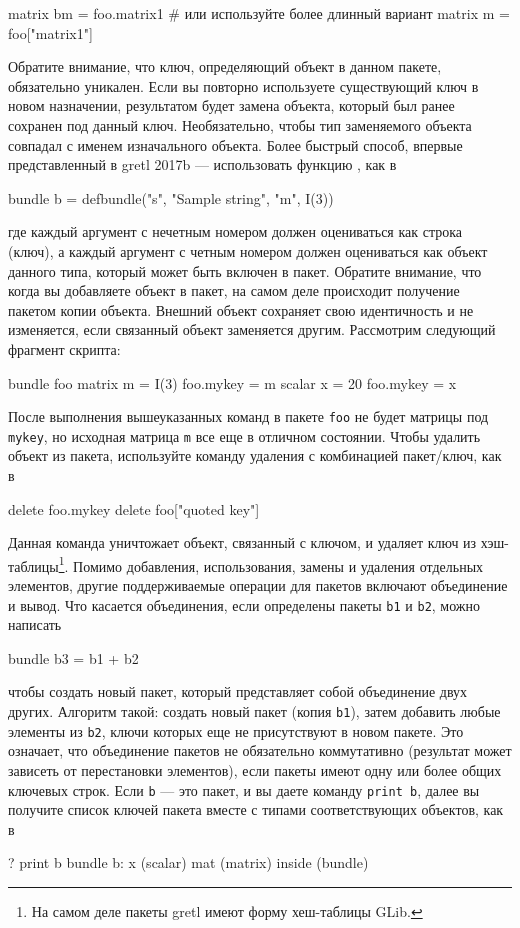 \begin{code}
matrix bm = foo.matrix1
# или используйте более длинный вариант 
matrix m = foo["matrix1"]
\end{code}
Обратите внимание, что ключ, определяющий объект в данном пакете,
обязательно уникален. Если вы повторно используете существующий ключ в
новом назначении, результатом будет замена объекта, который был ранее
сохранен под данный ключ. Необязательно, чтобы тип заменяемого объекта
совпадал с именем изначального объекта.  Более быстрый способ, впервые
представленный в gretl 2017b --- использовать функцию ,
как в

\begin{code}
  bundle b = defbundle("s", "Sample string", "m", I(3))
\end{code}
где каждый аргумент с нечетным номером должен оцениваться как строка
(ключ), а каждый аргумент с четным номером должен оцениваться как
объект данного типа, который может быть включен в пакет.  Обратите
внимание, что когда вы добавляете объект в пакет, на самом деле
происходит получение пакетом копии объекта. Внешний объект сохраняет
свою идентичность и не изменяется, если связанный объект заменяется
другим. Рассмотрим следующий фрагмент скрипта:

\begin{code}
bundle foo
matrix m = I(3)
foo.mykey = m
scalar x = 20
foo.mykey = x
\end{code}
После выполнения вышеуказанных команд в пакете \texttt{foo} не будет
матрицы под \texttt{mykey}, но исходная матрица \texttt{m} все еще в
отличном состоянии. Чтобы удалить объект из пакета, используйте
команду удаления с комбинацией пакет/ключ, как в
\begin{code}
delete foo.mykey
delete foo["quoted key"]
\end{code}
Данная команда уничтожает объект, связанный с ключом, и удаляет ключ
из хэш-таблицы\footnote{На самом деле пакеты gretl имеют форму
  хеш-таблицы \textsf{GLib}.}.  Помимо добавления, использования,
замены и удаления отдельных элементов, другие поддерживаемые операции
для пакетов включают объединение и вывод. Что касается объединения,
если определены пакеты \texttt{b1} и \texttt{b2}, можно написать

\begin{code}
bundle b3 = b1 + b2
\end{code}

чтобы создать новый пакет, который представляет собой объединение двух
других. Алгоритм такой: создать новый пакет (копия \texttt{b1}), затем
добавить любые элементы из \texttt{b2}, ключи которых еще не
присутствуют в новом пакете. Это означает, что объединение пакетов не
обязательно коммутативно (результат может зависеть от перестановки
элементов), если пакеты имеют одну или более общих ключевых строк.
Если \texttt{b} --- это пакет, и вы даете команду \texttt{print b},
далее вы получите список ключей пакета вместе с типами соответствующих
объектов, как в
\begin{code}
? print b
bundle b:
 x (scalar)
 mat (matrix)
 inside (bundle)
\end{code}


